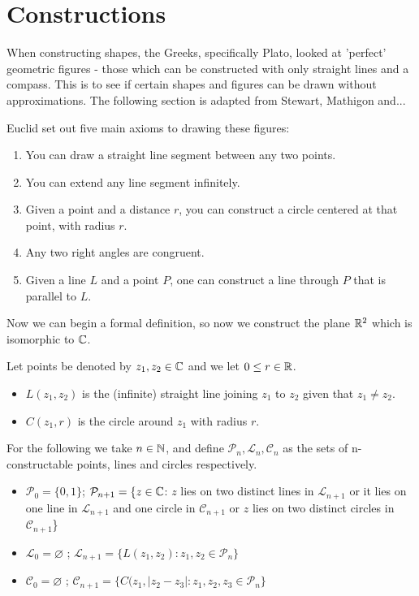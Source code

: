 \section{Constructions} \label{sec:applications}

When constructing shapes, the Greeks, specifically Plato, looked at 'perfect' geometric figures - those which can be constructed with only straight lines and a compass. This is to see if certain shapes and figures can be drawn without approximations. The following section is adapted from Stewart, Mathigon and...

Euclid set out five main axioms to drawing these figures:

\begin{enumerate}
    \item You can draw a straight line segment between any two points.
    \item You can extend any line segment infinitely.
    \item Given a point and a distance $r$, you can construct a circle centered at that point, with radius $r$.
    \item Any two right angles are congruent.
    \item Given a line $L$ and a point $P$, one can construct a line through $P$ that is parallel to $L$. 
\end{enumerate}

Now we can begin a formal definition, so now we construct the plane $\mathbb R^2$ which is isomorphic to $\mathbb C$. 
\begin{definition}
Let points be denoted by $z_1,z_2 \in \mathbb C$ and we let $0\leq r \in \mathbb R$.
    \begin{itemize}
        \item $L(z_1,z_2)$ is the (infinite) straight line joining $z_1$ to $z_2$ given that $z_1 \neq z_2$. 
        \item $C(z_1,r)$ is the circle around $z_1$ with radius $r$.
    \end{itemize}
    For the following we take $n \in \mathbb N$, and define $\mathcal{P}_n,\mathcal{L}_n,\mathcal{C}_n$ as the sets of n-constructable points, lines and circles respectively.
    \begin{itemize}
        \item $\mathcal{P}_0=\{0,1\}$; $\mathcal{P}_{n+1}=\{z\in \mathbb C $: $z$ lies on two distinct lines in $\mathcal{L}_{n+1}$ or it lies on one line in $\mathcal{L}_{n+1}$ and one circle in $\mathcal{C}_{n+1}$ or $z$ lies on two distinct circles in $\mathcal{C}_{n+1}$\}
        \item $\mathcal{L}_0=\varnothing$ ; $\mathcal{L}_{n+1}=\{L(z_1,z_2) : z_1,z_2\in \mathcal{P}_n\}$
        \item $\mathcal{C}_0=\varnothing$ ; $\mathcal{C}_{n+1}=\{C(z_1,|z_2-z_3|:z_1,z_2,z_3\in \mathcal{P}_n\}$
    \end{itemize}
\end{definition}

